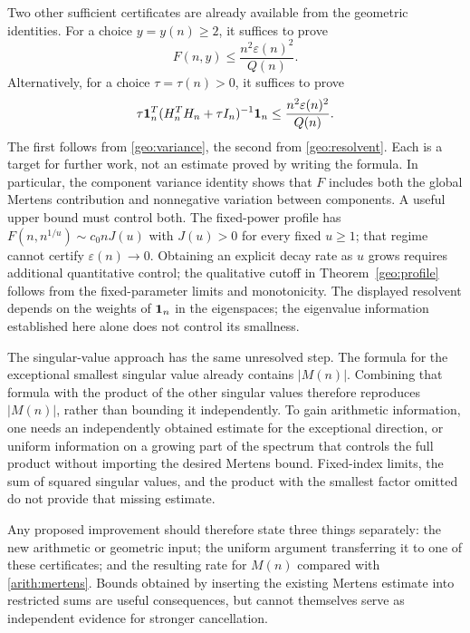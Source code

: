 Two other sufficient certificates are already available from the geometric identities. For a choice $y=y(n)\ge2$, it suffices to prove
\begin{equation}\label{disc:component-certificate}
 F(n,y)\le\frac{n^2\varepsilon(n)^2}{Q(n)}.
\end{equation}
Alternatively, for a choice $\tau=\tau(n)>0$, it suffices to prove
\begin{equation}\label{disc:resolvent-certificate}
 \tau\mathbf{1}_n^T(H_n^TH_n+\tau I_n)^{-1}\mathbf{1}_n
 \le\frac{n^2\varepsilon(n)^2}{Q(n)}.
\end{equation}
The first follows from \eqref{geo:variance}, the second from \eqref{geo:resolvent}. Each is a target for further work, not an estimate proved by writing the formula. In particular, the component variance identity shows that $F$ includes both the global Mertens contribution and nonnegative variation between components. A useful upper bound must control both. The fixed-power profile has $F(n,n^{1/u})\sim c_0nJ(u)$ with $J(u)>0$ for every fixed $u\ge1$; that regime cannot certify $\varepsilon(n)\to0$. Obtaining an explicit decay rate as $u$ grows requires additional quantitative control; the qualitative cutoff in Theorem~\ref{geo:profile} follows from the fixed-parameter limits and monotonicity. The displayed resolvent depends on the weights of $\mathbf{1}_n$ in the eigenspaces; the eigenvalue information established here alone does not control its smallness.

The singular-value approach has the same unresolved step. The formula for the exceptional smallest singular value already contains $|M(n)|$. Combining that formula with the product of the other singular values therefore reproduces $|M(n)|$, rather than bounding it independently. To gain arithmetic information, one needs an independently obtained estimate for the exceptional direction, or uniform information on a growing part of the spectrum that controls the full product without importing the desired Mertens bound. Fixed-index limits, the sum of squared singular values, and the product with the smallest factor omitted do not provide that missing estimate.

Any proposed improvement should therefore state three things separately: the new arithmetic or geometric input; the uniform argument transferring it to one of these certificates; and the resulting rate for $M(n)$ compared with \eqref{arith:mertens}. Bounds obtained by inserting the existing Mertens estimate into restricted sums are useful consequences, but cannot themselves serve as independent evidence for stronger cancellation.

